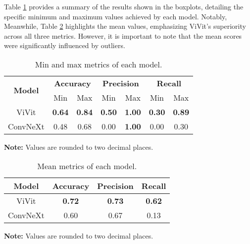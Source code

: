 Table \ref{tab:min_max_metrics} provides a summary of the results shown in the boxplots, detailing the specific minimum and maximum values achieved by each model. Notably, Meanwhile, Table \ref{tab:mean_metrics} highlights the mean values, emphasizing ViVit's superiority across all three metrics. However, it is important to note that the mean scores were significantly influenced by outliers.

\begin{table}[h]
    \centering
    \caption{Min and max metrics of each model.}
    \renewcommand{\arraystretch}{1.5}
    \begin{tabular}{|c|c|c|c|c|c|c|}
        \hline
        \multirow{2}{*}{\textbf{Model}} & \multicolumn{2}{|c|}{\textbf{Accuracy}} & \multicolumn{2}{|c|}{\textbf{Precision}} & \multicolumn{2}{|c|}{\textbf{Recall}} \\ \cline{2-7}
                               & Min  & Max   & Min  & Max   & Min  & Max   \\ \hline
        ViVit                  & \textbf{0.64} & \textbf{0.84}  & \textbf{0.50} & \textbf{1.00}  & \textbf{0.30} & \textbf{0.89}  \\ \hline
        ConvNeXt               & 0.48 & 0.68  & 0.00 & \textbf{1.00} & 0.00 & 0.30  \\ \hline
    \end{tabular}
    \begin{center}
        \parbox{\columnwidth}{\centering \footnotesize \textbf{Note:} Values are rounded to two decimal places.}
    \end{center}
    \label{tab:min_max_metrics}
\end{table}


\begin{table}[h]
    \centering
    \caption{Mean metrics of each model.}
    \renewcommand{\arraystretch}{1.5}
    \begin{tabular}{|c|c|c|c|}
        \hline
        \textbf{Model}     & \textbf{Accuracy}     & \textbf{Precision}     & \textbf{Recall}     \\ \hline
        ViVit     & \textbf{0.72}         & \textbf{0.73}          & \textbf{0.62}       \\ \hline
        ConvNeXt  & 0.60         & 0.67          & 0.13       \\ \hline
    \end{tabular}
    \begin{center}
        \parbox{\columnwidth}{\centering \footnotesize \textbf{Note:} Values are rounded to two decimal places.}
    \end{center}
    \label{tab:mean_metrics}
\end{table}

